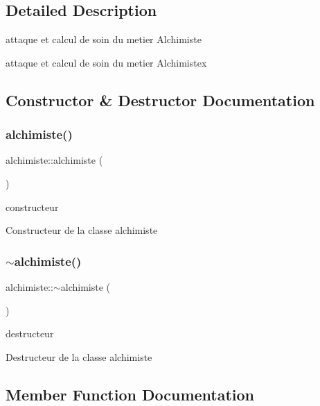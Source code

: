 \subsection{Detailed Description}
attaque et calcul de soin du metier Alchimiste 

attaque et calcul de soin du metier Alchimistex 

\subsection{Constructor \& Destructor Documentation}
\mbox{\label{classalchimiste_a64e152094587979b16814f3723dec41b}} 
\subsubsection{\texorpdfstring{alchimiste()}{alchimiste()}}
{\footnotesize\ttfamily alchimiste\+::alchimiste (\begin{DoxyParamCaption}{ }\end{DoxyParamCaption})}



constructeur 

Constructeur de la classe alchimiste \mbox{\label{classalchimiste_a745d9621bd0f7ec7de18aac096b6c87c}} 
\subsubsection{\texorpdfstring{$\sim$alchimiste()}{~alchimiste()}}
{\footnotesize\ttfamily alchimiste\+::$\sim$alchimiste (\begin{DoxyParamCaption}{ }\end{DoxyParamCaption})}



destructeur 

Destructeur de la classe alchimiste 

\subsection{Member Function Documentation}
\mbox{\label{classalchimiste_a2dc3e30d4b4c9847da55587b39aaf233}} 
